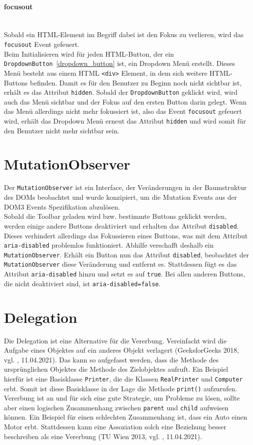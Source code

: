 \paragraph{focusout}\mbox{}\\
Sobald ein HTML-Element im Begriff dabei ist den Fokus zu verlieren, wird das \texttt{focusout} Event gefeuert.\\
Beim Initialisieren wird für jeden HTML-Button, der ein \texttt{DropdownButton}~\ref{dropdown_button} ist,  ein Dropdown Menü erstellt. Dieses Menü besteht aus einem HTML  \texttt{<div>} Element, in dem sich weitere HTML-Buttons befinden. Damit es für den Benutzer zu Beginn noch nicht sichtbar ist, erhält es das Attribut \texttt{hidden}. Sobald der \texttt{DropdownButton} geklickt wird, wird auch das Menü sichtbar und der Fokus auf den ersten Button darin gelegt. Wenn das Menü allerdings nicht mehr fokussiert ist, also das Event \texttt{focusout} gefeuert wird, erhält das Dropdown Menü erneut das Attribut \texttt{hidden} und wird somit für den Benutzer nicht mehr sichtbar sein.

\section{MutationObserver}
Der \texttt{MutationObserver} ist ein Interface, der Veränderungen in der Baumstruktur des DOMs beobachtet und wurde konzipiert, um die Mutation Events aus der DOM3 Events Spezifikation abzulösen.\\
Sobald die Toolbar geladen wird bzw. bestimmte Buttons geklickt werden, werden einige andere Buttons deaktiviert und erhalten das Attribut \texttt{disabled}. Dieses verhindert allerdings das Fokussieren eines Buttons, was mit dem Attribut \texttt{aria-disabled} problemlos funktioniert. Abhilfe verschafft deshalb ein \texttt{MutationObserver}. Erhält ein Button nun das Attribut \texttt{disabled}, beobachtet der \texttt{MutationObserver} diese Veränderung und entfernt es. Stattdessen fügt es das Attribut \texttt{aria-disabled} hinzu und setzt es auf \texttt{true}. Bei allen anderen Buttons, die nicht deaktiviert sind, ist \texttt{aria-disabled=false}.

\section{Delegation}
Die Delegation ist eine Alternative für die Vererbung. Vereinfacht wird die Aufgabe eines Objektes auf ein anderes Objekt verlagert (GeeksforGeeks 2018, vgl. \cite{delegation_2018}, 11.04.2021). Das kann so aufgefasst werden, dass die Methode des ursprünglichen Objektes die Methode des Zielobjektes aufruft. Ein Beispiel hierfür ist eine Basisklasse \texttt{Printer}, die die Klassen \texttt{RealPrinter} und \texttt{Computer} erbt. Somit ist diese Basisklasse in der Lage die Methode \texttt{print()} aufzurufen. Vererbung ist an und für sich eine gute Strategie, um Probleme zu lösen, sollte aber einen logischen Zusammenhang zwischen \texttt{parent} und \texttt{child} aufweisen können. Ein Beispiel für einen schlechten Zusammenhang ist, dass ein Auto einen Motor erbt. Stattdessen kann eine Assoziation solch eine Beziehung besser beschreiben als eine Vererbung (TU Wien 2013, vgl. \cite{tuv_delegation_2013}, 11.04.2021).

